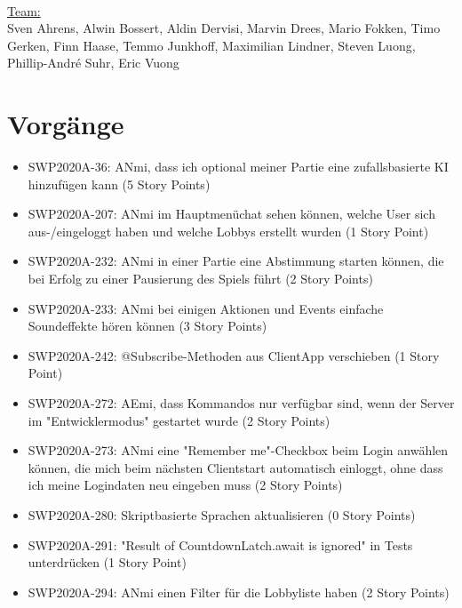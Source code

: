 \documentclass[12pt,a4paper, oneside]{article}
\begin{document}
    \noindent
    \\
    \underline {Team:}
    \\
    Sven Ahrens, Alwin Bossert, Aldin Dervisi, Marvin Drees, Mario Fokken,
    Timo Gerken, Finn Haase, Temmo Junkhoff, Maximilian Lindner, Steven Luong, Phillip-André Suhr, Eric Vuong


    \section{Vorgänge}

    \begin{itemize}

        \item SWP2020A-36: ANmi, dass ich optional meiner Partie eine zufallsbasierte KI hinzufügen kann (5 Story Points)

        \item SWP2020A-207: ANmi im Hauptmenüchat sehen können, welche User sich aus-/eingeloggt haben und welche Lobbys erstellt wurden (1 Story Point)

        \item SWP2020A-232: ANmi in einer Partie eine Abstimmung starten können, die bei Erfolg zu einer Pausierung des Spiels führt (2 Story Points)

        \item SWP2020A-233: ANmi bei einigen Aktionen und Events einfache Soundeffekte hören können (3 Story Points)

        \item SWP2020A-242: @Subscribe-Methoden aus ClientApp verschieben (1 Story Point)

        \item SWP2020A-272: AEmi, dass Kommandos nur verfügbar sind, wenn der Server im "Entwicklermodus" gestartet wurde (2 Story Points)

        \item SWP2020A-273: ANmi eine "Remember me"-Checkbox beim Login anwählen können, die mich beim nächsten Clientstart automatisch einloggt, ohne dass ich meine Logindaten neu eingeben muss (2 Story Points)

        \item SWP2020A-280: Skriptbasierte Sprachen aktualisieren (0 Story Points)

        \item SWP2020A-291:    "Result of CountdownLatch.await is ignored" in Tests unterdrücken (1 Story Point)

        \item SWP2020A-294: ANmi einen Filter für die Lobbyliste haben (2 Story Points)


\end{itemize}
\end{document}
